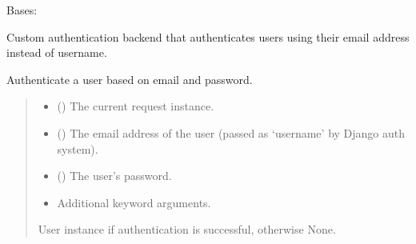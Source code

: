 \documentclass[letterpaper,10pt,english]{sphinxmanual}
\begin{document}
\begin{fulllineitems}
\label{\detokenize{users:users.backends.EmailBackend}}
\pysigstartsignatures
\pysigline
{}
\pysigstopsignatures
\sphinxAtStartPar
Bases: 

\sphinxAtStartPar
Custom authentication backend that authenticates users using their email address instead of username.

\begin{fulllineitems}
\label{\detokenize{users:users.backends.EmailBackend.authenticate}}
\pysigstartsignatures
\pysiglinewithargsret
{}
{\sphinxparamcomma {}\sphinxparamcomma {}\sphinxparamcomma {}}
{}
\pysigstopsignatures
\sphinxAtStartPar
Authenticate a user based on email and password.
\begin{quote}\begin{description}
\begin{itemize}
\item {} 
\sphinxAtStartPar
{} () \textendash{} The current request instance.

\item {} 
\sphinxAtStartPar
{} () \textendash{} The email address of the user (passed as ‘username’ by Django auth system).

\item {} 
\sphinxAtStartPar
{} () \textendash{} The user’s password.

\item {} 
\sphinxAtStartPar
{} \textendash{} Additional keyword arguments.

\end{itemize}

\sphinxAtStartPar
User instance if authentication is successful, otherwise None.

\end{description}\end{quote}

\end{fulllineitems}


\end{fulllineitems}
\end{document}
